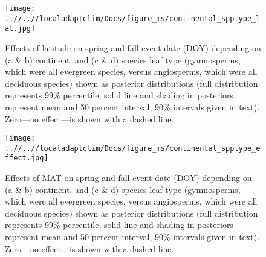 \documentclass[12pt]{article}
\begin{document}
\begin{figure}[!h] 
    \centering
 \texttt{[image: ..//..//localadaptclim/Docs/figure\_ms/continental\_spptype\_lat.jpg]}
    \caption{Effects of latitude on spring and fall event date (DOY) depending on (a \& b) continent, and (c \& d) species leaf type (gymnosperms, which were all evergreen species, versus angiosperms, which were all deciduous species) shown as posterior distributions (full distribution represents 99\% percentile, solid line and shading in posteriors represent mean and 50 percent interval, 90\% intervals given in text). Zero---no effect---is shown with a dashed line.}
    \label{figure:continental_spptype_lat}
\end{figure}

\begin{figure}[!h] 
    \centering
 \texttt{[image: ..//..//localadaptclim/Docs/figure\_ms/continental\_spptype\_effect.jpg]}
    \caption{Effects of MAT on spring and fall event date (DOY) depending on (a \& b) continent, and (c \& d) species leaf type (gymnosperms, which were all evergreen species, versus angiosperms, which were all deciduous species)  shown as posterior distributions (full distribution represents 99\% percentile, solid line and shading in posteriors represent mean and 50 percent interval, 90\% intervals given in text). Zero---no effect---is shown with a dashed line. } 
    \label{figure:continental_spptype_effect}
\end{figure}
\end{document}
